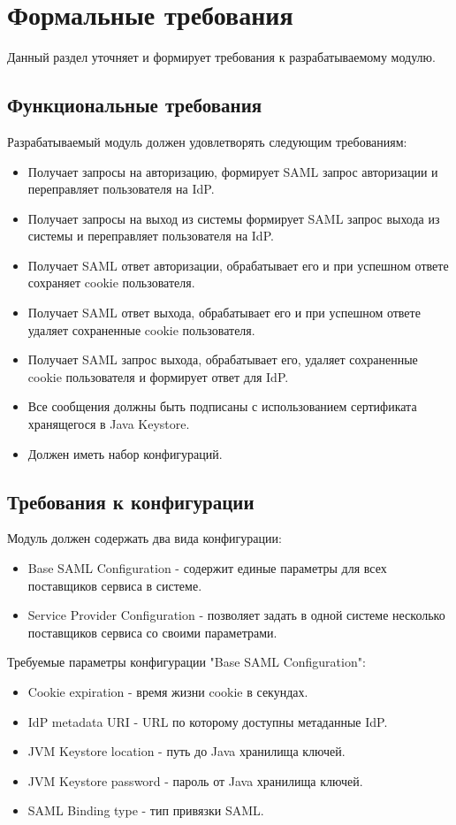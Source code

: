\section{Формальные требования}
Данный раздел уточняет и формирует требования к разрабатываемому модулю.

\subsection{Функциональные требования}
Разрабатываемый модуль должен удовлетворять следующим требованиям:
\begin{itemize}
\item Получает запросы на авторизацию, формирует SAML запрос авторизации и  переправляет пользователя на IdP.
\item Получает запросы на выход из системы формирует SAML запрос выхода из системы и переправляет пользователя на IdP.
\item Получает SAML ответ авторизации, обрабатывает его и при успешном ответе сохраняет cookie пользователя.
\item Получает SAML ответ выхода, обрабатывает его и при успешном ответе удаляет сохраненные cookie пользователя.
\item Получает SAML запрос выхода, обрабатывает его, удаляет сохраненные cookie пользователя и формирует ответ для IdP.
\item Все сообщения должны быть подписаны с использованием сертификата хранящегося в Java Keystore.
\item Должен иметь набор конфигураций.
\end{itemize}

\subsection{Требования к конфигурации}
Модуль должен содержать два вида конфигурации:
\begin{itemize}
\item Base SAML Configuration - содержит единые параметры для всех поставщиков сервиса в системе.
\item Service Provider Configuration - позволяет задать в одной системе несколько поставщиков сервиса со своими параметрами. 
\end{itemize}

Требуемые параметры конфигурации "Base SAML Configuration":
\begin{itemize}
\item Cookie expiration - время жизни cookie в секундах.
\item IdP metadata URI - URL по которому доступны метаданные IdP.
\item JVM Keystore location - путь до Java хранилища ключей.
\item JVM Keystore password - пароль от Java хранилища ключей.
\item SAML Binding type - тип привязки SAML.
\end{itemize}

